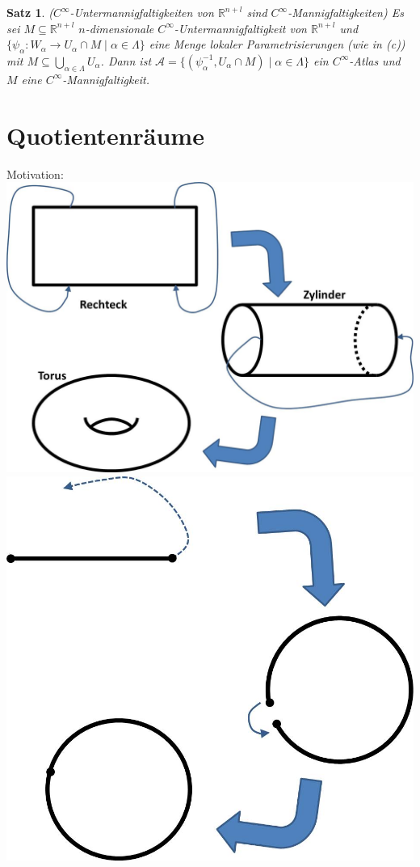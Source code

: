 \documentclass[a4paper,11pt,notitlepage]{report}
\newtheorem{theorem}{Satz}[chapter]
\newcommand{\R}{{\ensuremath{\mathbb{R}}}}
\begin{document}
\begin{theorem}{($C^\infty$-Untermannigfaltigkeiten von $\R^{n+l}$ sind $C^\infty$-Mannigfaltigkeiten)}
	Es sei $M \subseteq \R^{n+l}$ $n$-dimensionale $C^\infty$-Untermannigfaltigkeit von $\R^{n+l}$ und $\{\psi_\alpha \colon W_\alpha \rightarrow U_\alpha \cap M \mid \alpha \in \Lambda\}$ eine Menge lokaler Parametrisierungen (wie in (c)) mit $M \subseteq \bigcup\limits_{\alpha \in \Lambda}{U_\alpha}$.
	Dann ist $\mathcal{A} = \{(\psi_\alpha^{-1}, U_\alpha \cap M) \mid \alpha \in \Lambda\}$ ein $C^\infty$-Atlas und $M$ eine $C^\infty$-Mannigfaltigkeit.
\end{theorem}

\newpage
\section{Quotientenräume}
Motivation:\newline
\includegraphics[scale=0.6]{images/Identifizierung1.jpg}\newline
\includegraphics[scale=0.6]{images/Identifizierung2.jpg}\newline
\end{document}
